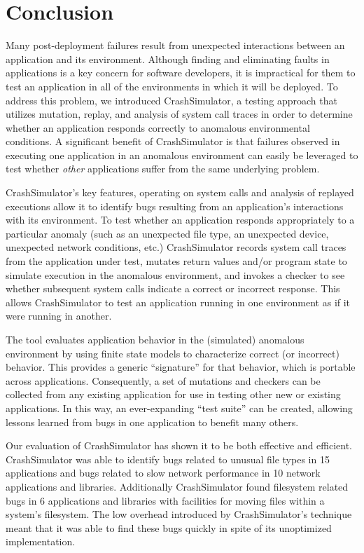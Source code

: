 \section{Conclusion} \label{sec:conclusion}
Many post-deployment failures result from
unexpected interactions between an application and its environment.
Although finding and eliminating faults in applications is a key concern for software developers, it is impractical for them to test an application in all of the
environments in which it will be deployed.
 To address this
problem, we introduced CrashSimulator, a testing
approach that utilizes mutation, replay, and analysis of system call traces
in order to determine whether an application responds correctly to
anomalous environmental conditions.
A significant benefit of CrashSimulator is that failures observed
in executing one application in an anomalous environment can
easily be leveraged to test whether {\em other} applications
suffer from the same underlying problem.

CrashSimulator's key features, operating on system calls and analysis of replayed executions allow it to identify bugs
resulting from an application's interactions with its environment.
To test whether an application responds appropriately to a particular
anomaly (such as an unexpected file type, an unexpected device, unexpected
network conditions, etc.)
CrashSimulator records system call traces from the application under test,
mutates return values and/or program state to simulate execution in 
the anomalous environment, and invokes a checker to see whether
subsequent system calls indicate a correct or incorrect response.
This allows
CrashSimulator to test an application running in one environment
as if it were running in another.

The tool evaluates application behavior in the (simulated) anomalous environment
by using
finite state models to characterize correct (or incorrect) behavior.
This provides a generic ``signature'' for that behavior, which is
portable across applications. 
Consequently, a set of mutations and checkers can be collected from any existing
application for use in testing other new or existing applications. 
In this way, an ever-expanding ``test suite'' can
be created, allowing lessons learned from bugs in one application to benefit many
others.

Our evaluation of CrashSimulator has shown it to be both effective and
efficient.  CrashSimulator was able to identify bugs related to unusual file
types in 15 applications and bugs related to slow network performance in 10
network applications and libraries.  Additionally CrashSimulator found
filesystem related bugs in 6 applications and libraries with facilities for
moving files within a system's filesystem.  The low overhead
introduced by CrashSimulator's technique meant that it was able to
find these bugs quickly in spite of its unoptimized implementation.

